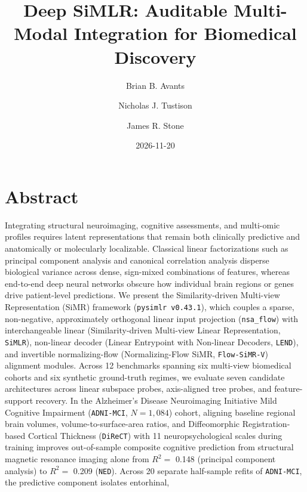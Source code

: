\documentclass[
  10pt,
  letterpaper,
]{report}
\title{Deep SiMLR: Auditable Multi-Modal Integration for Biomedical
Discovery}
\author{Brian B. Avants \and Nicholas J. Tustison \and James R. Stone}
\date{2026-11-20}
\renewcommand*\contentsname{Table of contents}
\newcommand\contentsname{Table of contents}
\begin{document}
\maketitle

\renewcommand*\contentsname{Table of contents}
{
\setcounter{tocdepth}{1}
\tableofcontents
}


\chapter*{Abstract}\label{abstract}


Integrating structural neuroimaging, cognitive assessments, and
multi-omic profiles requires latent representations that remain both
clinically predictive and anatomically or molecularly localizable.
Classical linear factorizations such as principal component analysis and
canonical correlation analysis disperse biological variance across
dense, sign-mixed combinations of features, whereas end-to-end deep
neural networks obscure how individual brain regions or genes drive
patient-level predictions. We present the Similarity-driven Multi-view
Representation (SiMR) framework (\texttt{pysimlr\ v0.43.1}), which
couples a sparse, non-negative, approximately orthogonal linear input
projection (\texttt{nsa\_flow}) with interchangeable linear
(Similarity-driven Multi-view Linear Representation, \texttt{SiMLR}),
non-linear decoder (Linear Entrypoint with Non-linear Decoders,
\texttt{LEND}), and invertible normalizing-flow (Normalizing-Flow SiMR,
\texttt{Flow-SiMR-V}) alignment modules. Across 12 benchmarks spanning
six multi-view biomedical cohorts and six synthetic ground-truth
regimes, we evaluate seven candidate architectures across linear
subspace probes, axis-aligned tree probes, and feature-support recovery.
In the Alzheimer's Disease Neuroimaging Initiative Mild Cognitive
Impairment (\texttt{ADNI-MCI}, \(N = 1,084\)) cohort, aligning baseline
regional brain volumes, volume-to-surface-area ratios, and Diffeomorphic
Registration-based Cortical Thickness (\texttt{DiReCT}) with 11
neuropsychological scales during training improves out-of-sample
composite cognitive prediction from structural magnetic resonance
imaging alone from \(R^2 =\) 0.148 (principal component analysis) to
\(R^2 =\) 0.209 (\texttt{NED}). Across 20 separate half-sample refits of
\texttt{ADNI-MCI}, the predictive component isolates entorhinal,
\end{document}
